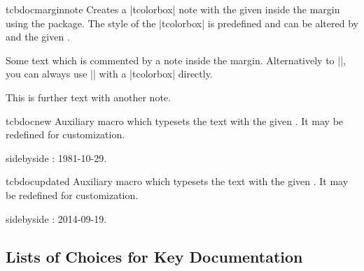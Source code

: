 \begin{docCommand}[doc new=2014-09-19]{tcbdocmarginnote}{}
  Creates a |tcolorbox| note with the given  inside the margin using
  the  package. The style of the |tcolorbox| is predefined and can be
  altered by  and the given .
\begin{dispExample}
Some text
which is commented by a note inside the margin.
Alternatively to |\tcbdocmarginnote|, you can always use
|\marginnote| with a |tcolorbox| directly.\par
This is further text%
with another note.
\end{dispExample}
\end{docCommand}

\begin{docCommand}[doc new=2014-09-19]{tcbdocnew}{}
  Auxiliary macro which typesets the  text with
  the given . It may be redefined for customization.
  \makeatletter\renewcommand*{\tcbdocnew}[1]{\kvtcb@text@new: #1}\makeatother%
\begin{dispExample*}{sidebyside}
\tcbdocnew{1981-10-29}.
\tcbdocmarginnote{\tcbdocnew{1978-02-09}}
\end{dispExample*}
\end{docCommand}

\begin{docCommand}[doc new=2014-09-19]{tcbdocupdated}{}
  Auxiliary macro which typesets the  text with
  the given . It may be redefined for customization.
  \makeatletter\renewcommand*{\tcbdocupdated}[1]{\kvtcb@text@updated: #1}\makeatother%
\begin{dispExample*}{sidebyside}
\tcbdocupdated{2014-09-19}.
\end{dispExample*}
\end{docCommand}


\clearpage
\subsection{Lists of Choices for Key Documentation}

